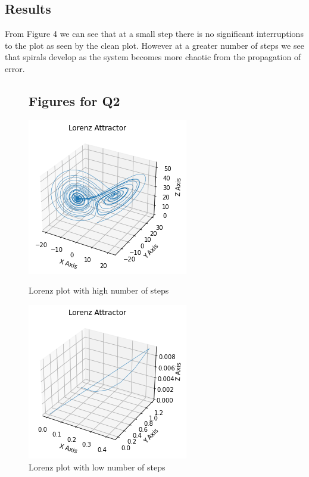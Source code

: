 \documentclass{article}
\begin{document}
\subsection{Results}
From Figure 4 we can see that at a small step there is no significant interruptions to the plot as seen by the clean plot. However at a greater number of steps we see that spirals develop as the system becomes more chaotic from the propagation of error.
\newpage
\begin{figure}
\subsection{Figures for Q2}
    \centering
    \includegraphics[]{lorenz1.png}
    \caption{Lorenz plot with high number of steps}
    \label{fig:1}
    \includegraphics[]{lorenz2.png}
    \caption{Lorenz plot with low number of steps}
    \label{fig:2}
\end{figure}
\newpage
\end{document}
